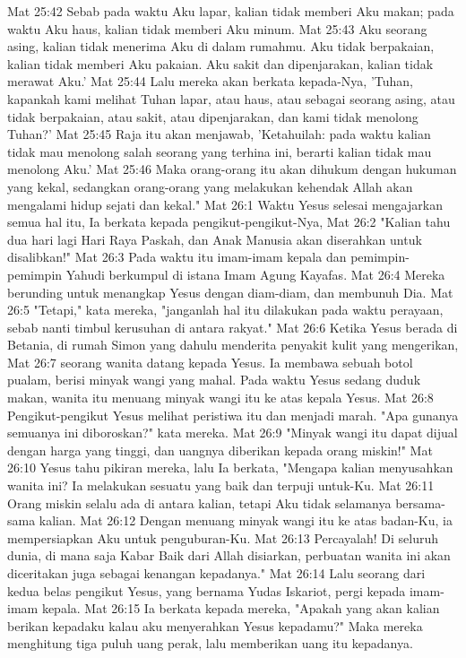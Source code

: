 Mat 25:42  Sebab pada waktu Aku lapar, kalian tidak memberi Aku makan; pada waktu Aku haus, kalian tidak memberi Aku minum.
Mat 25:43  Aku seorang asing, kalian tidak menerima Aku di dalam rumahmu. Aku tidak berpakaian, kalian tidak memberi Aku pakaian. Aku sakit dan dipenjarakan, kalian tidak merawat Aku.'
Mat 25:44  Lalu mereka akan berkata kepada-Nya, 'Tuhan, kapankah kami melihat Tuhan lapar, atau haus, atau sebagai seorang asing, atau tidak berpakaian, atau sakit, atau dipenjarakan, dan kami tidak menolong Tuhan?'
Mat 25:45  Raja itu akan menjawab, 'Ketahuilah: pada waktu kalian tidak mau menolong salah seorang yang terhina ini, berarti kalian tidak mau menolong Aku.'
Mat 25:46  Maka orang-orang itu akan dihukum dengan hukuman yang kekal, sedangkan orang-orang yang melakukan kehendak Allah akan mengalami hidup sejati dan kekal."
Mat 26:1  Waktu Yesus selesai mengajarkan semua hal itu, Ia berkata kepada pengikut-pengikut-Nya,
Mat 26:2  "Kalian tahu dua hari lagi Hari Raya Paskah, dan Anak Manusia akan diserahkan untuk disalibkan!"
Mat 26:3  Pada waktu itu imam-imam kepala dan pemimpin-pemimpin Yahudi berkumpul di istana Imam Agung Kayafas.
Mat 26:4  Mereka berunding untuk menangkap Yesus dengan diam-diam, dan membunuh Dia.
Mat 26:5  "Tetapi," kata mereka, "janganlah hal itu dilakukan pada waktu perayaan, sebab nanti timbul kerusuhan di antara rakyat."
Mat 26:6  Ketika Yesus berada di Betania, di rumah Simon yang dahulu menderita penyakit kulit yang mengerikan,
Mat 26:7  seorang wanita datang kepada Yesus. Ia membawa sebuah botol pualam, berisi minyak wangi yang mahal. Pada waktu Yesus sedang duduk makan, wanita itu menuang minyak wangi itu ke atas kepala Yesus.
Mat 26:8  Pengikut-pengikut Yesus melihat peristiwa itu dan menjadi marah. "Apa gunanya semuanya ini diboroskan?" kata mereka.
Mat 26:9  "Minyak wangi itu dapat dijual dengan harga yang tinggi, dan uangnya diberikan kepada orang miskin!"
Mat 26:10  Yesus tahu pikiran mereka, lalu Ia berkata, "Mengapa kalian menyusahkan wanita ini? Ia melakukan sesuatu yang baik dan terpuji untuk-Ku.
Mat 26:11  Orang miskin selalu ada di antara kalian, tetapi Aku tidak selamanya bersama-sama kalian.
Mat 26:12  Dengan menuang minyak wangi itu ke atas badan-Ku, ia mempersiapkan Aku untuk penguburan-Ku.
Mat 26:13  Percayalah! Di seluruh dunia, di mana saja Kabar Baik dari Allah disiarkan, perbuatan wanita ini akan diceritakan juga sebagai kenangan kepadanya."
Mat 26:14  Lalu seorang dari kedua belas pengikut Yesus, yang bernama Yudas Iskariot, pergi kepada imam-imam kepala.
Mat 26:15  Ia berkata kepada mereka, "Apakah yang akan kalian berikan kepadaku kalau aku menyerahkan Yesus kepadamu?" Maka mereka menghitung tiga puluh uang perak, lalu memberikan uang itu kepadanya.
